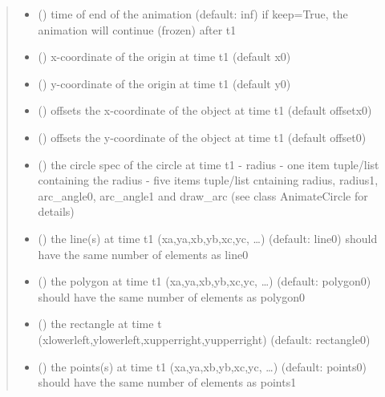 \documentclass[letterpaper,10pt,english]{sphinxmanual}
\begin{document}
\begin{fulllineitems}
\begin{fulllineitems}
\begin{quote}
\begin{description}
\begin{itemize}
\item {} 
 () \textendash{} time of end of the animation (default: inf) 
if keep=True, the animation will continue (frozen) after t1

\item {} 
 () \textendash{} x-coordinate of the origin at time t1 (default x0)

\item {} 
 () \textendash{} y-coordinate of the origin at time t1 (default y0)

\item {} 
 () \textendash{} offsets the x-coordinate of the object at time t1 (default offsetx0)

\item {} 
 () \textendash{} offsets the y-coordinate of the object at time t1 (default offset0)

\item {} 
 () \textendash{} the circle spec of the circle at time t1 
- radius 
- one item tuple/list containing the radius 
- five items tuple/list cntaining radius, radius1, arc\_angle0, arc\_angle1 and draw\_arc
(see class AnimateCircle for details)

\item {} 
 () \textendash{} the line(s) at time t1 (xa,ya,xb,yb,xc,yc, …) (default: line0) 
should have the same number of elements as line0

\item {} 
 () \textendash{} the polygon at time t1 (xa,ya,xb,yb,xc,yc, …) (default: polygon0) 
should have the same number of elements as polygon0

\item {} 
 () \textendash{} the rectangle at time t (xlowerleft,ylowerleft,xupperright,yupperright)
(default: rectangle0) 

\item {} 
 () \textendash{} the points(s) at time t1 (xa,ya,xb,yb,xc,yc, …) (default: points0) 
should have the same number of elements as points1


\end{itemize}
\end{description}
\end{quote}
\end{fulllineitems}
\end{fulllineitems}
\end{document}
